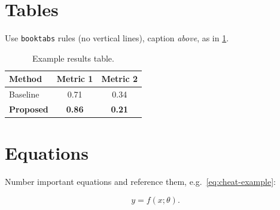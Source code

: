 \section{Tables}
Use \texttt{booktabs} rules (no vertical lines), caption \emph{above}, as in
\cref{tab:cheat-example}.

\begin{table}[ht]
  \centering
  \caption{Example results table.}
  \label{tab:cheat-example}
  \begin{tabular}{l c c}
    \toprule
    Method & Metric 1 & Metric 2 \\
    \midrule
    Baseline          & 0.71 & 0.34 \\
    \textbf{Proposed} & \textbf{0.86} & \textbf{0.21} \\
    \bottomrule
  \end{tabular}
\end{table}

\section{Equations}
Number important equations and reference them, e.g.\ \cref{eq:cheat-example}:

\begin{equation}
  \label{eq:cheat-example}
  y = f(x; \theta).
\end{equation}
